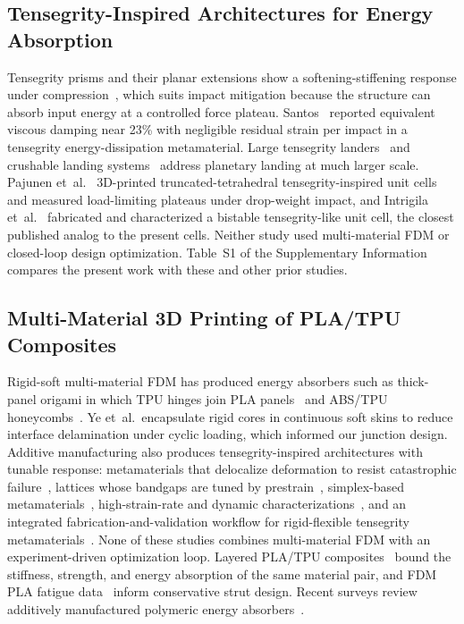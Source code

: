 \documentclass[11pt]{article}
\begin{document}
\subsection{Tensegrity-Inspired Architectures for Energy Absorption}

Tensegrity prisms and their planar extensions show a softening-stiffening
response under compression~\citep{amendola2014experimental,
zhang2018tensegrity, fraternali2015tensegrity}, which suits impact
mitigation because the structure can absorb input energy at a controlled
force plateau. Santos~\cite{santos2023towardanovel} reported equivalent
viscous damping near 23\% with negligible residual strain per impact in a
tensegrity energy-dissipation metamaterial. Large tensegrity
landers~\citep{agogino2018superball, caluwaerts2014superball,
sabelhaus2015system, vespignani2018design, deitrich2022titan} and
crushable landing systems~\citep{cloutier1966landing,
adams2004merairbag, jackson2014honeycomb} address planetary landing at
much larger scale. Pajunen et~al.~\cite{pajunen2019design} 3D-printed
truncated-tetrahedral tensegrity-inspired unit cells and measured
load-limiting plateaus under drop-weight impact, and Intrigila
et~al.~\cite{intrigila2022fabricationandexperimental} fabricated and
characterized a bistable tensegrity-like unit cell, the closest published
analog to the present cells. Neither study used multi-material FDM or
closed-loop design optimization. Table~S1 of the
Supplementary Information compares the present work with these and
other prior studies.

\subsection{Multi-Material 3D Printing of PLA/TPU Composites}

Rigid-soft multi-material FDM has produced energy absorbers such as
thick-panel origami in which TPU hinges join PLA
panels~\cite{ye2023multimaterial} and ABS/TPU
honeycombs~\cite{khatri2024energy}. Ye et~al.\ encapsulate rigid cores
in continuous soft skins to reduce interface delamination under cyclic
loading, which informed our junction design. Additive manufacturing also
produces tensegrity-inspired architectures with tunable response:
metamaterials that delocalize deformation to resist catastrophic
failure~\cite{bauer2021tensegrity}, lattices whose bandgaps are tuned
by prestrain~\cite{pajunen2021prestrain}, simplex-based
metamaterials~\cite{sabounizawadzka2024experimental}, high-strain-rate
and dynamic characterizations~\cite{almeida2025highstrainrate,
davami2025dynamicanalysis}, and an integrated fabrication-and-validation
workflow for rigid-flexible tensegrity
metamaterials~\cite{wang2026integrated}. None of these studies combines
multi-material FDM with an experiment-driven optimization loop. Layered
PLA/TPU composites~\citep{arifvianto2022mechanicalpropertiesof} bound
the stiffness, strength, and energy absorption of the same material
pair, and FDM PLA fatigue data~\citep{ezeh2018onthefatigue,
vanaei2021multiscaledamageanalysis} inform conservative strut design.
Recent surveys review additively manufactured polymeric energy
absorbers~\citep{bustihan2026recentadvancesin,
liu2026threedimensionalprintedlattice}.
\end{document}
